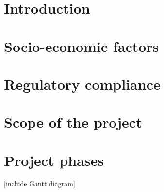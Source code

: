\section{Introduction}


\section{Socio-economic factors}

\section{Regulatory compliance}

\section{Scope of the project}

\section{Project phases}
[include Gantt diagram]




